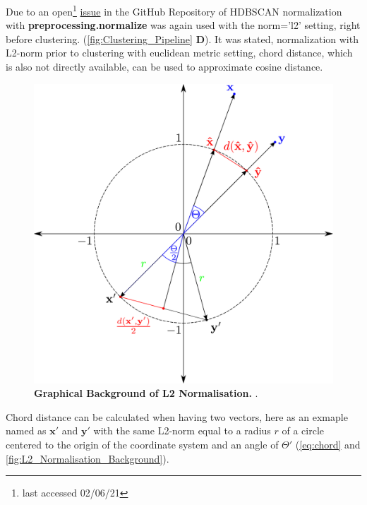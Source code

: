 Due to an open\footnote{last accessed 02/06/21} \href{https://github.com/scikit-learn-contrib/hdbscan/issues/69}{issue} in the GitHub Repository of \gls{HDBSCAN} normalization with \textbf{preprocessing.normalize} was again used with the \colorbox{backcolour}{norm='l2'} setting, right before clustering. (\autoref{fig:Clustering_Pipeline} \textsf{\textbf{D}}). It was stated, normalization with L2-norm prior to clustering with euclidean metric setting, chord distance, which is also not directly available, can be used to approximate cosine distance.

\begin{figure}[!hbt]
    \centering
    \includegraphics[width=\textwidth]{Graphics/L2_Euclidean.pdf}
    \caption[Graphical Background of L2 Normalisation]{\textbf{Graphical Background of L2 Normalisation.} .}
    \label{fig:L2_Normalisation_Background}
\end{figure}

Chord distance can be calculated when having two vectors, here as an exmaple named as $\mathbf{x}'$ and $\mathbf{y}'$ with the same L2-norm equal to a radius $r$ of a circle centered to the origin of the coordinate system and an angle of $\Theta'$ (\autoref{eq:chord} and \autoref{fig:L2_Normalisation_Background}). 

